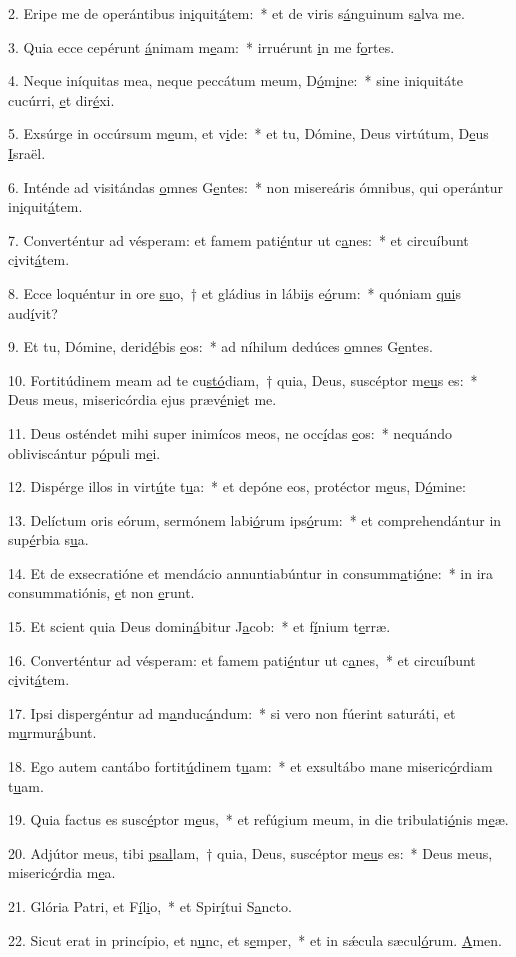 2. Eripe me de operántibus in\uline{i}quit\uline{á}tem:~* et de viris s\uline{á}nguinum s\uline{a}lva me.\par 
3. Quia ecce cepérunt \uline{á}nimam m\uline{e}am:~* irruérunt \uline{i}n me f\uline{o}rtes.\par 
4. Neque iníquitas mea, neque peccátum meum, D\uline{ó}m\uline{i}ne:~* sine iniquitáte cucúrri, \uline{e}t dir\uline{é}xi.\par 
5. Exsúrge in occúrsum m\uline{e}um, et v\uline{i}de:~* et tu, Dómine, Deus virtútum, D\uline{e}us \uline{I}sraël.\par 
6. Inténde ad visitándas \uline{o}mnes G\uline{e}ntes:~* non misereáris ómnibus, qui operántur in\uline{i}quit\uline{á}tem.\par 
7. Converténtur ad vésperam: et famem pati\uline{é}ntur ut c\uline{a}nes:~* et circuíbunt c\uline{i}vit\uline{á}tem.\par 
8. Ecce loquéntur in ore \uline{su}o,~† et gládius in lábi\uline{i}s e\uline{ó}rum:~* quóniam \uline{qui}s aud\uline{í}vit?\par 
9. Et tu, Dómine, derid\uline{é}bis \uline{e}os:~* ad níhilum dedúces \uline{o}mnes G\uline{e}ntes.\par 
10. Fortitúdinem meam ad te cu\uline{stó}diam,~† quia, Deus, suscéptor m\uline{e}\uline{u}s es:~* Deus meus, misericórdia ejus præv\uline{é}ni\uline{e}t me.\par 
11. Deus osténdet mihi super inimícos meos, ne occ\uline{í}das \uline{e}os:~* nequándo obliviscántur p\uline{ó}puli m\uline{e}i.\par 
12. Dispérge illos in virt\uline{ú}te t\uline{u}a:~* et depóne eos, protéctor m\uline{e}us, D\uline{ó}mine:\par 
13. Delíctum oris eórum, sermónem labi\uline{ó}rum ips\uline{ó}rum:~* et comprehendántur in sup\uline{é}rbia s\uline{u}a.\par 
14. Et de exsecratióne et mendácio annuntiabúntur in consumm\uline{a}ti\uline{ó}ne:~* in ira consummatiónis, \uline{e}t non \uline{e}runt.\par 
15. Et scient quia Deus domin\uline{á}bitur J\uline{a}cob:~* et f\uline{í}nium t\uline{e}rræ.\par 
16. Converténtur ad vésperam: et famem pati\uline{é}ntur ut c\uline{a}nes,~* et circuíbunt c\uline{i}vit\uline{á}tem.\par 
17. Ipsi dispergéntur ad m\uline{a}nduc\uline{á}ndum:~* si vero non fúerint saturáti, et m\uline{u}rmur\uline{á}bunt.\par 
18. Ego autem cantábo fortit\uline{ú}dinem t\uline{u}am:~* et exsultábo mane miseric\uline{ó}rdiam t\uline{u}am.\par 
19. Quia factus es susc\uline{é}ptor m\uline{e}us,~* et refúgium meum, in die tribulati\uline{ó}nis m\uline{e}æ.\par 
20. Adjútor meus, tibi \uline{psal}lam,~† quia, Deus, suscéptor m\uline{e}\uline{u}s es:~* Deus meus, miseric\uline{ó}rdia m\uline{e}a.\par 
21. Glória Patri, et F\uline{í}l\uline{i}o,~* et Spir\uline{í}tui S\uline{a}ncto.\par 
22. Sicut erat in princípio, et n\uline{u}nc, et s\uline{e}mper,~* et in sǽcula sæcul\uline{ó}rum. \uline{A}men.\par 
